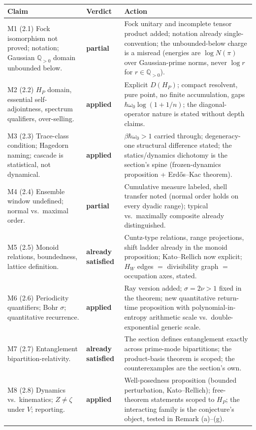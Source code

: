 \documentclass[11pt,a4paper]{article}
\newcommand{\ok}{\textbf{applied}}
\newcommand{\Qq}{\mathbb{Q}}
\newcommand{\pver}{\textbf{partial}}
\newcommand{\sat}{\textbf{already satisfied}}
\begin{document}
\begin{longtable}{@{}p{}p{}p{}@{}}
\toprule
\textbf{Claim} & \textbf{Verdict} & \textbf{Action}\\
\midrule
\endhead
M1 (2.1) Fock isomorphism not proved; notation; Gaussian $\Qq_{>0}$ domain
unbounded below. & \pver & Fock unitary and incomplete tensor product added;
notation already single-convention; the unbounded-below charge is a misread
(energies are $\log N(\pi)$ over Gaussian-prime norms, never $\log r$ for
$r\in\Qq_{>0}$).\\
M2 (2.2) $H_P$ domain, essential self-adjointness, spectrum qualifiers,
over-selling. & \ok & Explicit $D(H_P)$; compact resolvent, pure point, no
finite accumulation, gaps $\hbar\omega_0\log(1+1/n)$; the diagonal-operator
nature is stated without depth claims.\\
M3 (2.3) Trace-class condition; Hagedorn naming; cascade is statistical, not
dynamical. & \ok & $\beta\hbar\omega_0>1$ carried through; degeneracy-one
structural difference stated; the statics/dynamics dichotomy is the section's
spine (frozen-dynamics proposition + Erd\H{o}s--Kac theorem).\\
M4 (2.4) Ensemble window undefined; normal vs.\ maximal order. & \pver &
Cumulative measure labeled, shell transfer noted (normal order holds on every
dyadic range); typical vs.\ maximally composite already distinguished.\\
M5 (2.5) Monoid relations, boundedness, lattice definition. & \sat & Cuntz-type
relations, range projections, shift ladder already in the monoid proposition;
Kato--Rellich now explicit; $H_W$ edges $=$ divisibility graph $=$ occupation
axes, stated.\\
M6 (2.6) Periodicity quantifiers; Bohr $\sigma$; quantitative recurrence. &
\ok & Ray version added; $\sigma=2\nu>1$ fixed in the theorem; new quantitative
return-time proposition with polynomial-in-entropy arithmetic scale vs.\
double-exponential generic scale.\\
M7 (2.7) Entanglement bipartition-relativity. & \sat & The section defines
entanglement exactly across prime-mode bipartitions; the product-basis theorem
is scoped; the counterexamples are the section's own.\\
M8 (2.8) Dynamics vs.\ kinematics; $Z\neq\zeta$ under $V$; reporting. & \ok &
Well-posedness proposition (bounded perturbation, Kato--Rellich); free-theorem
statements scoped to $H_P$; the interacting family is the conjecture's object,
tested in Remark (a)--(g).\\

\end{longtable}
\end{document}
